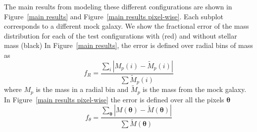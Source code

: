 \documentclass[galley,usenatbib]{mn2e}
\newcommand{\M}{\ensuremath{\mathscr{M}}}
\newcommand{\figref}[1] {Figure~\ref{#1}}
\renewcommand{\vec}[1]{\ensuremath{\boldsymbol{#1}}}
\begin{document}
The main results from modeling these different configurations are shown in
\figref{main results} and \figref{main results pixel-wise}. Each
subplot corresponds to a different mock galaxy. We show the fractional error of the mass
distribution for each of the test configurations with (red) and without stellar mass (black)
In \figref{main results}, the error is defined over radial bins of mass as
%
\begin{equation} \label{badness}
  f_R = \frac {\sum_i \left|M_p(i) - \tilde M_p(i)\right| } {\sum \tilde M_p(i)}
\end{equation}
%
where $M_p$ is the mass in a radial bin and $\tilde M_p$ is the mass from the mock galaxy.
In \figref{main results pixel-wise} the error is defined over all the pixels $\vec\theta$
%
\begin{equation} \label{badness}
f_\theta = \frac {\sum_{\vec\theta} \left|M(\vec\theta) - \tilde M(\vec\theta)\right| } {\sum \tilde M(\vec\theta)}
\end{equation}
%
\end{document}
